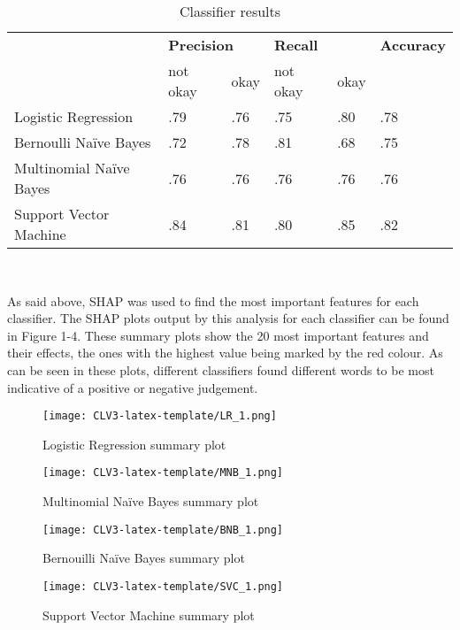 \documentclass[final]{clv3} %
\begin{document}
\begin{table}[h]
\begin{tabular}{l|ll|ll|l|}
\cline{2-6}
                                              & \multicolumn{2}{l|}{\textbf{Precision}}       & \multicolumn{2}{l|}{\textbf{Recall}}          & \multirow{}{}{\textbf{Accuracy}} \\ \cline{2-5}
                                              & \multicolumn{1}{l|}{not okay} & okay & \multicolumn{1}{l|}{not okay} & okay &                           \\ \hline
\multicolumn{1}{|l|}{Logistic Regression}     & \multicolumn{1}{l|}{.79}      & .76  & \multicolumn{1}{l|}{.75}      & .80  & .78                       \\ \hline
\multicolumn{1}{|l|}{Bernoulli Naïve Bayes}   & \multicolumn{1}{l|}{.72}      & .78  & \multicolumn{1}{l|}{.81}      & .68  & .75                       \\ \hline
\multicolumn{1}{|l|}{Multinomial Naïve Bayes} & \multicolumn{1}{l|}{.76}      & .76  & \multicolumn{1}{l|}{.76}      & .76  & .76                       \\ \hline
\multicolumn{1}{|l|}{Support Vector Machine}  & \multicolumn{1}{l|}{.84}      & .81  & \multicolumn{1}{l|}{.80}      & .85  & .82                       \\ \hline
\end{tabular}
\caption{Classifier results}
\label{tab:table-1}
\end{table}\\

\newpage

As said above, SHAP \cite{shap} was used to find the most important features for each classifier. The SHAP plots output by this analysis for each classifier can be found in Figure 1-4.  These summary plots show the 20 most important features and their effects, the ones with the highest value being marked by the red colour. As can be seen in these plots, different classifiers found different words to be most indicative of a positive or negative judgement.\\


\begin{figure}[h]
    \texttt{[image: CLV3-latex-template/LR\_1.png]}
    \caption{Logistic Regression summary plot}\label{fig:shap-lr}
\endminipage
{}
    \texttt{[image: CLV3-latex-template/MNB\_1.png]}
    \caption{Multinomial Naïve Bayes summary plot}\label{fig:shap-mnb}
\endminipage
\end{figure}
\begin{figure}[h]
%
    \texttt{[image: CLV3-latex-template/BNB\_1.png]}
    \caption{Bernouilli Naïve Bayes summary plot}\label{fig:shap-bnb}
\endminipage
{}%
    \texttt{[image: CLV3-latex-template/SVC\_1.png]}
    \caption{Support Vector Machine summary plot}\label{fig:shap-bnb}
\endminipage
\end{figure}\\\
\end{document}

